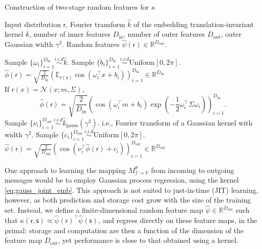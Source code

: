 \documentclass[english]{article}
\theoremstyle{plain}
\theoremstyle{plain}
\newcommand{\factor}{f}				%
\newcommand{\outV}{V}                         %
\newcommand{\approxMsg}[3]{M_{#1 \rightarrow #2}^{#3}}			%
\begin{document}
\begin{algorithm}[t]
\caption{Construction of two-stage random features for $\kappa$}
\label{algo:random_features_kgg}
\begin{algorithmic}[1]
\REQUIRE Input distribution $\mathsf{r}$, Fourier transform $\hat{k}$ of 
the embedding translation-invariant kernel $k$, number of inner features $D_\mathrm{in}$, number of outer features $D_\mathrm{out}$, outer Gaussian width $\gamma^2$.
\ENSURE Random features $\hat{\psi}(\mathsf{r}) \in \mathbb{R}^{D_\mathrm{out}}$. 

\STATE Sample  $\{ \omega_i \}_{i=1}^{D_\mathrm{in}} \overset{i.i.d}{\sim} \hat{k}$.
\STATE Sample $\{b_i\}_{i=1}^{D_\mathrm{in}} \overset{i.i.d}{\sim} \text{Uniform}[0, 2\pi] $.
\STATE $\hat{\phi}(\mathsf{r}) = \sqrt{\frac{2}{D_\mathrm{in}}} \left( \mathbb{E}_{\mathsf{r(x)}} 
\cos(\omega_{i}^{\top}x+b_{i} ) \right)_{i=1}^{D_\mathrm{in}} \in \mathbb{R}^{D_\mathrm{in}}$ \\
If $\mathsf{r}(x)=\mathcal{N}(x;m, \Sigma )$, 
\small
\begin{equation*}
\hat{\phi}( \mathsf{r}) = \sqrt{\frac{2}{D_\mathrm{in}}} \left( \cos(\omega_{i}^{\top}m +b_{i}) \exp 
\left(-\frac{1}{2}\omega_{i}^{\top}\Sigma \omega_{i} \right) \right)_{i=1}^{D_\mathrm{in}}.
\end{equation*}
%
\STATE Sample $\{ \nu_i \}_{i=1}^{D_\mathrm{out}} \overset{i.i.d}{\sim} \hat{k}_{\text{gauss}}(\gamma^{2})$.  
i.e., Fourier transform of a Gaussian kernel with width $\gamma^2$.
\STATE Sample $\{c_i\}_{i=1}^{D_\mathrm{out}} \overset{i.i.d}{\sim} \text{Uniform}[0, 2\pi] $.
\STATE $\hat{\psi}(\mathsf{r}) = \sqrt{\frac{2}{D_\mathrm{out}}} \left(  
\cos(\nu_{i}^{\top} \hat{\phi}(\mathsf{r}) + c_{i} ) \right)_{i=1}^{D_\mathrm{out}} \in 
\mathbb{R}^{D_\mathrm{out}}$
\end{algorithmic}
\end{algorithm}

One approach to learning the mapping  $\approxMsg{\factor}{\outV}{\theta}$ from incoming to outgoing messages
would be to employ Gaussian process regression, using the kernel \eqref{eq:gauss_joint_emb}.
This approach is not suited to just-in-time (JIT) learning, however,
as both prediction and storage cost grow with the size of the training set.
Instead, we define 
a finite-dimensional random feature map $\hat{\psi} \in \mathbb{R}^{D_\mathrm{out}}$ such that 
$\kappa(\mathsf{r}, \mathsf{s}) \approx \hat{\psi}(\mathsf{r})^\top \hat{\psi}(\mathsf{s})$, 
and regress directly on these feature maps, in the primal: storage and computation 
are then a function of the dimension of the feature map $D_\mathrm{out}$, yet performance is close to that
obtained using a kernel.
\end{document}
